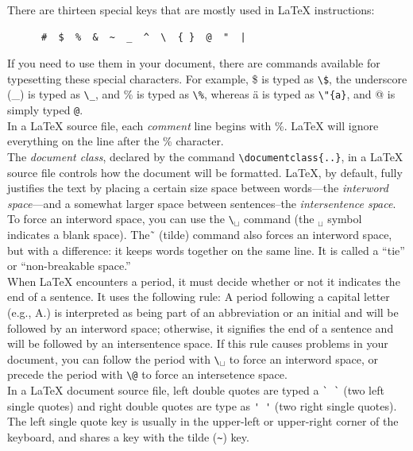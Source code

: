 There are thirteen special keys that are mostly used in \LaTeX \; instructions:
\begin{center}
   \begin{verbatim}
      #  $  %  &  ~  _  ^  \  { }  @  "  |
   \end{verbatim}
\end{center}
If you need to use them in your document, there  are commands available for typesetting these special characters. For example, \$ is typed as \verb+\$+, the underscore (\_) is typed as \verb+\_+, and \% is typed as \verb+\%+, whereas \"{a} is typed as \verb+\"{a}+, and @ is simply typed \verb+@+.\\

In a \LaTeX \; source file, each \emph{comment} line begins with \%. \LaTeX \;  will ignore everything on the line after the \% character. \\

The \emph{document class}, declared by the command \verb+\documentclass{..}+, in a \LaTeX \; source file controls how the document will be formatted. \LaTeX, by default, fully justifies the text by placing a certain size space between words---the \emph{interword space}---and a somewhat larger space between sentences--the \emph{intersentence space}.  To force an interword space, you can use the \verb+\+$_{\sqcup}$ command (the $_{\sqcup}$ symbol indicates a blank space). The \~ \, (tilde) command also forces an interword space, but with a difference: it keeps words together on the same line.  It is called a ``tie'' or ``non-breakable space.''\\

When \LaTeX \; encounters a period, it must decide whether or not it indicates the end of a sentence. It uses the following rule: A period following a capital letter (e.g., A.) is interpreted as being part of an abbreviation or an initial and will be followed by an interword space; otherwise, it signifies the end of a sentence and will be followed by an intersentence space.  If this rule causes problems in your document, you can follow the period with  \verb+\+$_{\sqcup}$ to force an interword space, or precede the period with \verb+\@+ to force an intersetence space.\\

In a \LaTeX \; document source file, left double quotes are typed a \verb+` `+ (two left single quotes) and right double quotes are type as \verb+' '+ (two right single quotes). The left single quote key is usually in the upper-left or upper-right corner of the keyboard, and shares a key with the tilde (\verb+~+) key.\\

